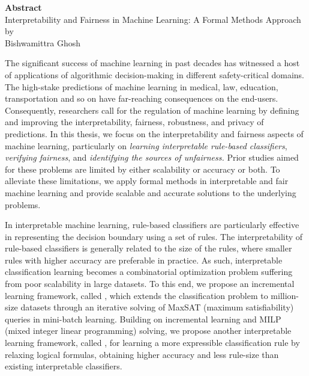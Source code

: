 	\begin{center}
		\textbf{Abstract}\\
		\vspace{2em}
		Interpretability and Fairness in Machine Learning: A Formal Methods Approach\\
		\vspace{1em}
		by\\
		\vspace{1em}
		Bishwamittra Ghosh\\
		\vspace{1em}
	\end{center}
	
	The significant success of machine learning in past decades has witnessed a host of applications of algorithmic decision-making in different safety-critical domains. The high-stake predictions of machine learning in medical, law, education, transportation and so on have far-reaching consequences on the end-users. Consequently, researchers call for the regulation of machine learning by defining and improving the interpretability, fairness, robustness, and privacy of predictions.  In this thesis, we focus on the interpretability and fairness aspects of machine learning, particularly on \emph{learning interpretable rule-based classifiers}, \emph{verifying fairness}, and \emph{identifying the sources of unfairness.} Prior studies aimed for these problems are limited by either scalability or  accuracy or both. To alleviate these limitations, we apply formal methods in interpretable and fair machine learning and provide scalable and accurate solutions to the underlying problems.
	
	
	In interpretable machine learning, rule-based classifiers are particularly effective in representing the decision boundary using a set of rules. The interpretability of rule-based classifiers is generally related to the size of the rules, where smaller rules with higher accuracy are preferable in practice. As such, interpretable classification learning becomes a combinatorial optimization problem suffering from poor scalability in large datasets. To this end, we propose an incremental learning framework, called {\imli}, which extends the classification problem to million-size datasets through an iterative solving of MaxSAT (maximum satisfiability) queries in mini-batch learning. Building on incremental learning and MILP (mixed integer linear programming) solving, we propose another interpretable learning framework, called {\crr}, for learning a more expressible classification rule by relaxing logical formulas, obtaining higher accuracy and less rule-size than existing interpretable classifiers.
	
